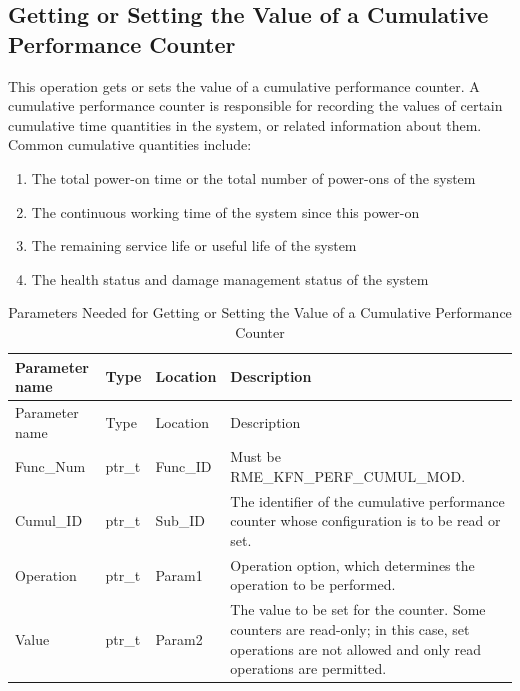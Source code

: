 \subsection{Getting or Setting the Value of a Cumulative Performance Counter}\label{subsec:8-get-or-set-cumulative-performance-counter}

This operation gets or sets the value of a cumulative performance counter. A cumulative performance counter is responsible for recording the values of certain cumulative time quantities in the system, or related information about them. Common cumulative quantities include:

\begin{enumerate}
\def\labelenumi{\arabic{enumi}.}
\item
  The total power-on time or the total number of power-ons of the system
\item
  The continuous working time of the system since this power-on
\item
  The remaining service life or useful life of the system
\item
  The health status and damage management status of the system
\end{enumerate}

\begin{xltabular}{\textwidth}{@{}>{\hsize\raggedright\arraybackslash}X>{\hsize\raggedright\arraybackslash}X>{\hsize\raggedright\arraybackslash}X>{\hsize\raggedright\arraybackslash}X@{}}
\caption{Parameters Needed for Getting or Setting the Value of a Cumulative Performance Counter}\label{tab:8-70-get-or-set-cumulative-performance-counter-parameters}\\
\toprule
Parameter name & Type & Location & Description\tabularnewline
\endfirsthead
\toprule
Parameter name & Type & Location & Description\tabularnewline
\midrule
\endhead
\bottomrule
\endlastfoot
Func\_Num & ptr\_t & Func\_ID & Must be RME\_KFN\_PERF\_CUMUL\_MOD.\tabularnewline
Cumul\_ID & ptr\_t & Sub\_ID &
The identifier of the cumulative performance counter whose configuration is to be read or set.\tabularnewline
Operation & ptr\_t & Param1 &
Operation option, which determines the operation to be performed.\tabularnewline
Value & ptr\_t & Param2 &
The value to be set for the counter. Some counters are read-only; in this case, set operations are not allowed and only read operations are permitted.\tabularnewline
\end{xltabular}
\nopagebreak[4]

